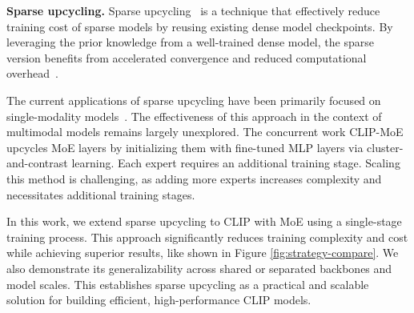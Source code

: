 \textbf{Sparse upcycling.} Sparse upcycling~\cite{komatsuzaki2023sparseupcyclingtrainingmixtureofexperts} is a technique that effectively reduce training cost of sparse models by reusing existing dense model checkpoints. By leveraging the prior knowledge from a well-trained dense model, the sparse version benefits from accelerated convergence and reduced computational overhead~\cite{he2024upcyclinglargelanguagemodels}.

The current applications of sparse upcycling have been primarily focused on single-modality models~\cite{komatsuzaki2023sparseupcyclingtrainingmixtureofexperts,he2024upcyclinglargelanguagemodels}. The effectiveness of this approach in the context of multimodal models remains largely unexplored. The concurrent work CLIP-MoE~\cite{zhang2024clipmoebuildingmixtureexperts} upcycles MoE layers by initializing them with fine-tuned MLP layers via cluster-and-contrast learning. Each expert requires an additional training stage. Scaling this method is challenging, as adding more experts increases complexity and necessitates additional training stages.

In this work, we extend sparse upcycling to CLIP with MoE using a single-stage training process. This approach significantly reduces training complexity and cost while achieving superior results, like shown in Figure \ref{fig:strategy-compare}. We also demonstrate its generalizability across shared or separated backbones 
and model scales. This establishes sparse upcycling as a practical and scalable solution for building efficient, high-performance CLIP models.

